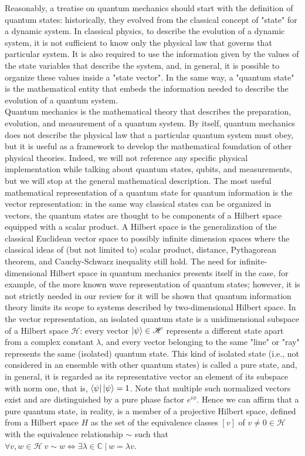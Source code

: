 \documentclass[journal, letterpaper]{IEEEtran}
\begin{document}
Reasonably, a treatise on quantum mechanics should start with the definition of quantum states: historically, they evolved from the classical concept of "state" for a dynamic system. In classical physics, to describe the evolution of a dynamic system, it is not sufficient to know only the physical law that governs that particular system. It is also required to use the information given by the values of the state variables that describe the system, and, in general, it is possible to organize these values inside a "state vector". 
In the same way, a "quantum state" is the mathematical entity that embeds the information needed to describe the evolution of a quantum system.\\ 
Quantum mechanics is the mathematical theory that describes the preparation, evolution, and measurement of a quantum system. By itself, quantum mechanics does not describe the physical law that a particular quantum system must obey, but it is useful as a framework to develop the mathematical foundation of other physical theories. Indeed, we will not reference any specific physical implementation while talking about quantum states, qubits, and measurements, but we will stop at the general mathematical description.
The most useful mathematical representation of a quantum state for quantum information is the vector representation: in the same way classical states can be organized in vectors, the quantum states are thought to be components of a Hilbert space equipped with a scalar product. 
A Hilbert space is the generalization of the classical Euclidean vector space to possibly infinite dimension spaces where the classical ideas of (but not limited to) scalar product, distance, Pythagorean theorem, and Cauchy-Schwarz inequality still hold. The need for infinite-dimensional Hilbert space in quantum mechanics presents itself in the case, for example, of the more known wave representation of quantum states; however, it is not strictly needed in our review for it will be shown that quantum information theory limits its scope to systems described by two-dimensional Hilbert space. 
In the vector representation, an isolated quantum state is a unidimensional subspace of a Hilbert space $\mathscr{H}$: every vector $\ket{\psi} \in \mathscr{H}$ represents a different state apart from a complex constant $\lambda$, and every vector belonging to the same "line" or "ray" represents the same (isolated) quantum state. 
This kind of isolated state (i.e., not considered in an ensemble with other quantum states) is called a pure state, and, in general, it is regarded as its representative vector an element of its subspace with norm one, that is, $\bra{\psi}\ket{\psi} = 1$. Note that multiple such normalized vectors exist and are distinguished by a pure phase factor $e^{i\phi}$. Hence we can affirm that a pure quantum state, in reality, is a member of a projective Hilbert space, defined from a Hilbert space $H$ as the set of the equivalence classes $[v]$ of $ v \neq 0 \in \mathscr{H}$ with the equivalence relationship $\sim$ such that \( \forall v, w \in \mathscr{H} \: v \sim w \iff \exists\lambda \in \mathbb{C}\:|\: w = \lambda v \).
\end{document}
